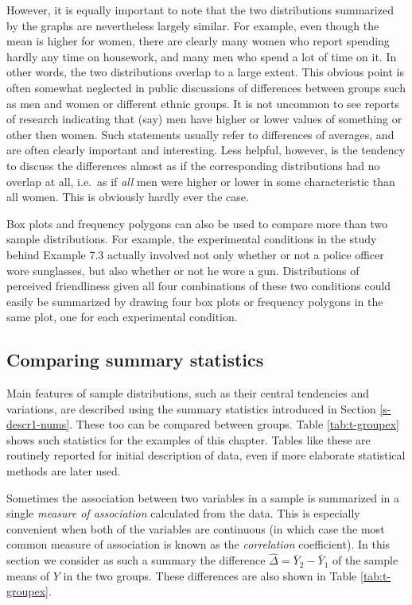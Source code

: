 \documentclass[11pt,a4paper,openany]{book}
\begin{document}
However, it is equally important to note that the two distributions
summarized by the graphs are nevertheless largely similar. For example,
even though the mean is higher for women, there are clearly many women
who report spending hardly any time on housework, and many men who spend
a lot of time on it. In other words, the two distributions overlap to a
large extent. This obvious point is often somewhat neglected in public
discussions of differences between groups such as men and women or
different ethnic groups. It is not uncommon to see reports of research
indicating that (say) men have higher or lower values of something or
other then women. Such statements usually refer to differences of
averages, and are often clearly important and interesting. Less helpful,
however, is the tendency to discuss the differences almost as if the
corresponding distributions had no overlap at all, i.e.~as if \emph{all}
men were higher or lower in some characteristic than all women. This is
obviously hardly ever the case.

Box plots and frequency polygons can also be used to compare more than
two sample distributions. For example, the experimental conditions in
the study behind Example 7.3 actually involved not only whether or not a
police officer wore sunglasses, but also whether or not he wore a gun.
Distributions of perceived friendliness given all four combinations of
these two conditions could easily be summarized by drawing four box
plots or frequency polygons in the same plot, one for each experimental
condition.

\subsection{Comparing summary statistics}\label{ss-means-descr-tables}

Main features of sample distributions, such as their central tendencies
and variations, are described using the summary statistics introduced in
Section \ref{s-descr1-nums}. These too can be compared between groups.
Table \ref{tab:t-groupex} shows such statistics for the examples of this
chapter. Tables like these are routinely reported for initial
description of data, even if more elaborate statistical methods are
later used.

Sometimes the association between two variables in a sample is
summarized in a single \emph{measure of association} calculated from the
data. This is especially convenient when both of the variables are
continuous (in which case the most common measure of association is
known as the \emph{correlation} coefficient). In this section we
consider as such a summary the difference
\(\hat{\Delta}=\bar{Y}_{2}-\bar{Y}_{1}\) of the sample means of \(Y\) in
the two groups. These differences are also shown in Table
\ref{tab:t-groupex}.
\end{document}
